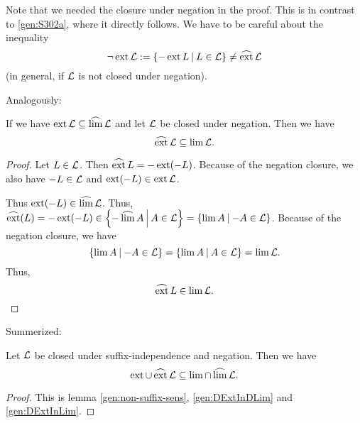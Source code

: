 Note that we needed the closure under negation in the proof. This is in contrast to \cref{gen:S302a}, where it directly follows. We have to be careful about the inequality
\[ \neg\ext \Lang := \Set{-\ext L}{L \in \Lang} \neq \dext \Lang \]
(in general, if $\mathcal{L}$ is not closed under negation).

Analogously:

\begin{lemma}
\label{gen:DExtInLim}
If we have $\operatorname{ext} \mathcal{L} \subseteq \operatorname{\widehat{lim}} \mathcal{L}$ and let $\mathcal{L}$ be closed under negation. Then we have
\[ \operatorname{\widehat{ext}} \mathcal{L} \subseteq \lim \mathcal{L} . \]
\begin{proof}
Let $L \in \mathcal{L}$. Then $ \operatorname{\widehat{ext}} L = - \operatorname{ext} (-L) $. Because of the negation closure, we also have $-L \in \mathcal{L}$ and $\operatorname{ext}(-L) \in \operatorname{ext} \mathcal{L}$.

Thus $\operatorname{ext}(-L) \in \operatorname{\widehat{lim}} \mathcal{L}$. Thus, $\dext(L) = -\ext(-L) \in \Set{-\dlim A}{A \in \Lang} = \Set{\lim A}{-A \in \Lang}$. Because of the negation closure, we have
\[ \Set{\lim A}{-A \in \Lang} = \Set{\lim A}{A \in \Lang} = \lim \Lang . \]
Thus,
\[ \operatorname{\widehat{ext}} L \in \lim \mathcal{L} . \]
\end{proof}
\end{lemma}

Summerized:

\begin{lemma}
\label{gen:extInLim}
Let $\mathcal{L}$ be closed under suffix-independence and negation. Then we have
\[ \operatorname{ext} \cup \operatorname{\widehat{ext}} \mathcal{L} \subseteq \lim \cap \operatorname{\widehat{lim}} \mathcal{L} . \]
\begin{proof}
This is lemma \ref{gen:non-suffix-sens}, \ref{gen:DExtInDLim} and \ref{gen:DExtInLim}.
\end{proof}
\end{lemma}


